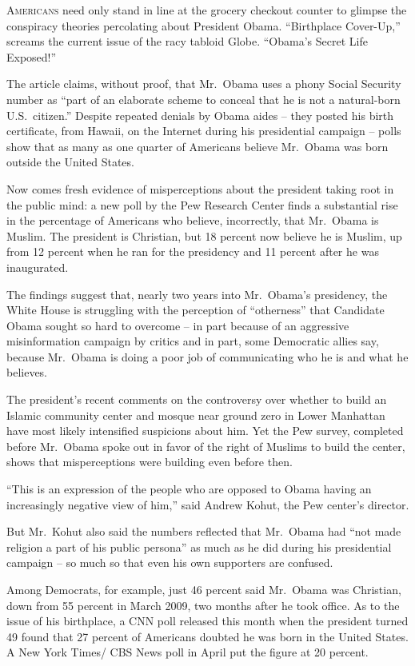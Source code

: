 ﻿\documentclass[12pt]{article}
\begin{document}
\lettrine{A}{mericans} need only stand in line at the grocery checkout
counter to glimpse the conspiracy theories percolating about President Obama. ``Birthplace
Cover-Up,'' screams the current issue of the racy tabloid Globe. ``Obama's Secret Life Exposed!''

The article claims, without proof, that Mr.~Obama uses a phony Social Security number as ``part of
an elaborate scheme to conceal that he is not a natural-born U.S.~citizen.'' Despite repeated
denials by Obama aides -- they posted his birth certificate, from Hawaii, on the Internet during his
presidential campaign -- polls show that as many as one quarter of Americans believe Mr.~Obama was
born outside the United States.

Now comes fresh evidence of misperceptions about the president taking root in the public mind: a new
poll by the Pew Research Center finds a substantial rise in the percentage of Americans who believe,
incorrectly, that Mr.~Obama is Muslim. The president is Christian, but 18 percent now believe he is
Muslim, up from 12 percent when he ran for the presidency and 11 percent after he was inaugurated.

The findings suggest that, nearly two years into Mr.~Obama's presidency, the White House is
struggling with the perception of ``otherness'' that Candidate Obama sought so hard to overcome --
in part because of an aggressive misinformation campaign by critics and in part, some Democratic
allies say, because Mr.~Obama is doing a poor job of communicating who he is and what he believes.

The president's recent comments on the controversy over whether to build an Islamic community center
and mosque near ground zero in Lower Manhattan have most likely intensified suspicions about him.
Yet the Pew survey, completed before Mr.~Obama spoke out in favor of the right of Muslims to build
the center, shows that misperceptions were building even before then.

``This is an expression of the people who are opposed to Obama having an increasingly negative view
of him,'' said Andrew Kohut, the Pew center's director.

But Mr.~Kohut also said the numbers reflected that Mr.~Obama had ``not made religion a part of his
public persona'' as much as he did during his presidential campaign -- so much so that even his own
supporters are confused.

Among Democrats, for example, just 46 percent said Mr.~Obama was Christian, down from 55 percent in
March 2009, two months after he took office. As to the issue of his birthplace, a CNN poll released
this month when the president turned 49 found that 27 percent of Americans doubted he was born in
the United States. A New York Times/ CBS News poll in April put the figure at 20 percent.
\end{document}
